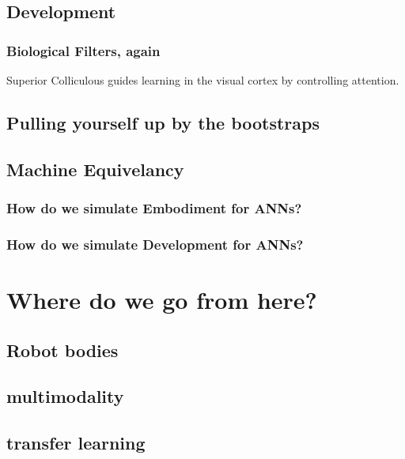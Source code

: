 \subsection{Development}
\subsubsection{Biological Filters, again}
Superior Colliculous guides learning in the visual cortex by controlling attention.
\subsection{Pulling yourself up by the bootstraps}

\subsection{Machine Equivelancy}
\subsubsection{How do we simulate Embodiment for ANNs?}
\subsubsection{How do we simulate Development for ANNs?}

\section{Where do we go from here?}
\subsection{Robot bodies}
\subsection{multimodality}
\subsection{transfer learning}


